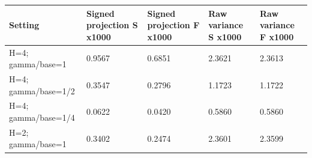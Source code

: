 \begin{tabular}{lllll}
Setting & Signed projection S x1000 & Signed projection F x1000 & Raw variance S x1000 & Raw variance F x1000 \\
\hline
H=4; gamma/base=1 & 0.9567 & 0.6851 & 2.3621 & 2.3613 \\
H=4; gamma/base=1/2 & 0.3547 & 0.2796 & 1.1723 & 1.1722 \\
H=4; gamma/base=1/4 & 0.0622 & 0.0420 & 0.5860 & 0.5860 \\
H=2; gamma/base=1 & 0.3402 & 0.2474 & 2.3601 & 2.3599 \\
\end{tabular}
